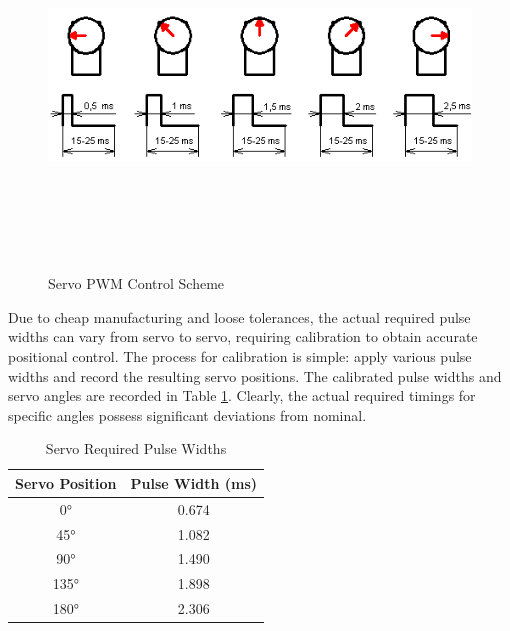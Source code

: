 \begin{figure}[H]   %
	\centering \includegraphics[width=6in, height=3.85in, keepaspectratio]{figures/servo_pulse_width.png}
	\caption{Servo PWM Control Scheme \cite{servo_pulse_width}}\label{fig:servo_pulse_width}
\end{figure}

Due to cheap manufacturing and loose tolerances, the actual required pulse widths can vary from servo to servo, requiring calibration to obtain accurate positional control. The process for calibration is simple: apply various pulse widths and record the resulting servo positions. The calibrated pulse widths and servo angles are recorded in Table \ref{tab:servo_angles}. Clearly, the actual required timings for specific angles possess significant deviations from nominal. 

\begin{table}[h]
	\centering \caption{Servo Required Pulse Widths}	\label{tab:servo_angles}
	\begin{tabular}{cc}
		\toprule 
		Servo Position & Pulse Width (ms) \\ 
		\midrule 
		\ang{0} & 0.674 \\ 
		\ang{45} & 1.082 \\
		\ang{90} & 1.490 \\ 
		\ang{135} & 1.898 \\ 
		\ang{180} & 2.306 \\ 
		\bottomrule 
	\end{tabular} 
\end{table}

